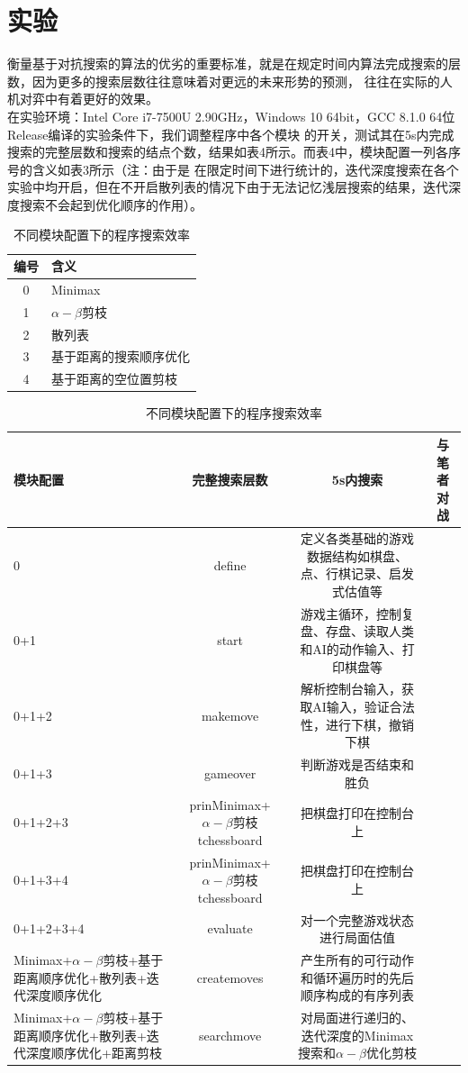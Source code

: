 \documentclass{acm_proc_article-sp}
\begin{document}
\section{\textbf{实验}}
衡量基于对抗搜索的算法的优劣的重要标准，就是在规定时间内算法完成搜索的层数，因为更多的搜索层数往往意味着对更远的未来形势的预测，
往往在实际的人机对弈中有着更好的效果。\\
在实验环境：Intel Core i7-7500U 2.90GHz，Windows 10 64bit，GCC 8.1.0 64位Release编译的实验条件下，我们调整程序中各个模块
的开关，测试其在5s内完成搜索的完整层数和搜索的结点个数，结果如表4所示。而表4中，模块配置一列各序号的含义如表3所示（注：由于是
在限定时间下进行统计的，迭代深度搜索在各个实验中均开启，但在不开启散列表的情况下由于无法记忆浅层搜索的结果，迭代深度搜索不会起到优化顺序的作用）。
\begin{table}
    \centering
    \caption{不同模块配置下的程序搜索效率}
    \begin{tabular}{|c|l|} \hline
    编号 & 含义\\ \hline
    0 & Minimax\\ \hline
    1 & $\alpha-\beta$剪枝\\ \hline
    2 & 散列表\\ \hline
    3 & 基于距离的搜索顺序优化\\ \hline
    4 & 基于距离的空位置剪枝\\ \hline
    \end{tabular}
\end{table}

\begin{table}
    \centering
    \caption{不同模块配置下的程序搜索效率}
    \begin{tabular}{|l|c|c|c|} \hline
    模块配置 & 完整搜索层数 & 5s内搜索 & 与笔者对战\\ \hline
    0 & define & 定义各类基础的游戏数据结构如棋盘、点、行棋记录、启发式估值等\\ \hline
    0+1 & start & 游戏主循环，控制复盘、存盘、读取人类和AI的动作输入、打印棋盘等\\ \hline
    0+1+2 & makemove & 解析控制台输入，获取AI输入，验证合法性，进行下棋，撤销下棋\\ \hline
    0+1+3 & gameover & 判断游戏是否结束和胜负\\ \hline
    0+1+2+3 & prinMinimax+$\alpha-\beta$剪枝tchessboard & 把棋盘打印在控制台上\\ \hline
    0+1+3+4 & prinMinimax+$\alpha-\beta$剪枝tchessboard & 把棋盘打印在控制台上\\ \hline
    0+1+2+3+4 & evaluate & 对一个完整游戏状态进行局面估值\\ \hline
    Minimax+$\alpha-\beta$剪枝+基于距离顺序优化+散列表+迭代深度顺序优化 & createmoves & 产生所有的可行动作和循环遍历时的先后顺序构成的有序列表\\ \hline
    Minimax+$\alpha-\beta$剪枝+基于距离顺序优化+散列表+迭代深度顺序优化+距离剪枝 & searchmove & 对局面进行递归的、迭代深度的Minimax搜索和$\alpha-\beta$优化剪枝\\ \hline
    \end{tabular}
\end{table}
\end{document}
